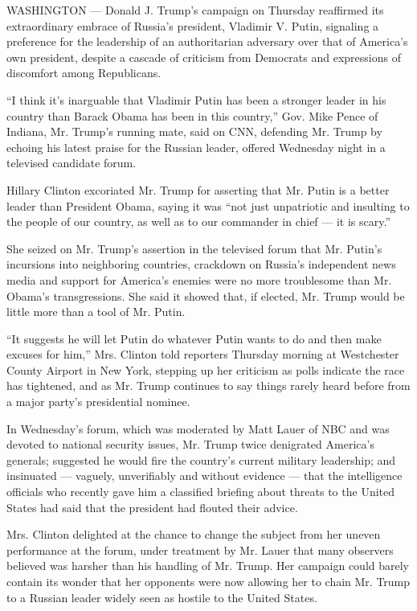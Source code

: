 WASHINGTON --- Donald J. Trump's campaign on Thursday reaffirmed its
extraordinary embrace of Russia's president, Vladimir V. Putin,
signaling a preference for the leadership of an authoritarian adversary
over that of America's own president, despite a cascade of criticism
from Democrats and expressions of discomfort among Republicans.

``I think it's inarguable that Vladimir Putin has been a stronger leader
in his country than Barack Obama has been in this country,'' Gov. Mike
Pence of Indiana, Mr. Trump's running mate, said on CNN, defending Mr.
Trump by echoing his latest praise for the Russian leader, offered
Wednesday night in a televised candidate forum.

Hillary Clinton excoriated Mr. Trump for asserting that Mr. Putin is a
better leader than President Obama, saying it was ``not just unpatriotic
and insulting to the people of our country, as well as to our commander
in chief --- it is scary.''

She seized on Mr. Trump's assertion in the televised forum that Mr.
Putin's incursions into neighboring countries, crackdown on Russia's
independent news media and support for America's enemies were no more
troublesome than Mr. Obama's transgressions. She said it showed that, if
elected, Mr. Trump would be little more than a tool of Mr. Putin.

``It suggests he will let Putin do whatever Putin wants to do and then
make excuses for him,'' Mrs. Clinton told reporters Thursday morning at
Westchester County Airport in New York, stepping up her criticism as
polls indicate the race has tightened, and as Mr. Trump continues to say
things rarely heard before from a major party's presidential nominee.

In Wednesday's forum, which was moderated by Matt Lauer of NBC and was
devoted to national security issues, Mr. Trump twice denigrated
America's generals; suggested he would fire the country's current
military leadership; and insinuated --- vaguely, unverifiably and
without evidence --- that the intelligence officials who recently gave
him a classified briefing about threats to the United States had said
that the president had flouted their advice.

Mrs. Clinton delighted at the chance to change the subject from her
uneven performance at the forum, under treatment by Mr. Lauer that many
observers believed was harsher than his handling of Mr. Trump. Her
campaign could barely contain its wonder that her opponents were now
allowing her to chain Mr. Trump to a Russian leader widely seen as
hostile to the United States.

